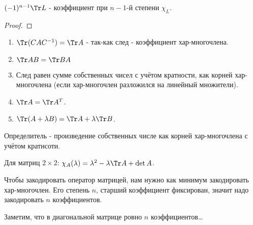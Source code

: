 \begin{statement} \thmslashn

    $(-1)^{n-1}\Tr L$ - коэффициент при $n-1$-й степени $\chi_{L}$.
    \begin{proof} \thmslashn
    
    \end{proof}
\end{statement}
\begin{properties} \thmslashn

    \begin{enumerate}
        \item $\Tr(CAC^{-1}) = \Tr A$ - так-как след - коэффициент хар-многочлена.
        \item $\Tr AB = \Tr BA$
        \item След равен сумме собственных чисел с учётом кратности, как корней хар-многочлена (если хар-многочлен разложился на линейный множители).
        \item $\Tr A = \Tr A^{T}$.
        \item $\Tr(A+\lambda B) = \Tr A + \lambda \Tr B$.
    \end{enumerate}
\end{properties}
\begin{remark} \thmslashn

    Определитель - произведение собственных числе как корней хар-многочлена с учётом кратнсоти.
\end{remark}
\begin{remark} \thmslashn

    Для матриц $2 \times 2$: $\chi_{A}(\lambda) = \lambda^2 - \lambda\Tr A + \det A$.
\end{remark}

Чтобы закодировать оператор матрицей, нам нужно как минимум закодировать хар-многочлен. Его степень $n$, старший коэффициент фиксирован, значит надо закодировать $n$ коэффициентов.

Заметим, что в диагональной матрице ровно $n$ коэффициентов\ldots

